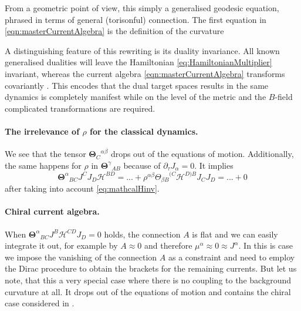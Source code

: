 \documentclass[11pt,a4paper]{article}
\numberwithin{equation}{section}
\begin{document}
From a geometric point of view, this simply a generalised geodesic equation, phrased in terms of general (torisonful) connection. The first equation in \eqref{eqn:masterCurrentAlgebra} is the definition of the curvature 

A distinguishing feature of this rewriting is its duality invariance. All known generalised dualities will leave the Hamiltonian \eqref{eq:HamiltonianMultiplier} invariant, whereas the current algebra \eqref{eqn:masterCurrentAlgebra} transforms covariantly \cite{Sfetsos:1997pi,Osten:2019ayq,Demulder:2019vvh,Borsato:2021gma,Butter:2022iza}. This encodes that the dual target spaces results in the same dynamics is completely manifest while on the level of the metric and the $B$-field complicated transformations are required.  

\paragraph{The irrelevance of $\rho$ for the classical dynamics.}
We see that the tensor ${\mathbf{\Theta}_C}^{\alpha \beta}$ drops out of the equations of motion. Additionally, the same happens for $\rho$ in ${\mathbf{\Theta}^\gamma}_{AB}$ because of $\partial_\tau J_\alpha = 0$. It implies 
\begin{equation}
	{\mathbf{\Theta}^\alpha}_{BC} J^C J_D \mathcal{H}^{BD} = ... + \rho^{\alpha \beta} {\Theta_{\beta B}}^{(C} \mathcal{H}^{D)B} J_C J_D = ... + 0
\end{equation}
after taking into account \eqref{eq:mathcalHinv}.


\paragraph{Chiral current algebra.} When ${\mathbf{\Theta}^\alpha}_{BC} J^B \mathcal{H}^{CD} J_D = 0$ holds, the connection $A$ is flat and we can easily integrate it out, for example by $A\approx 0$ and therefore $\mu^\alpha \approx 0 \approx J^\alpha$. In this is case we impose the vanishing of the connection $A$ as a constraint and need to employ the Dirac procedure to obtain the brackets for the remaining currents. But let us note, that this a very special case where there is no coupling to the background curvature at all. It drops out of the equations of motion and contains the chiral case considered in \cite{Lacroix:2023ybi}.
\end{document}
